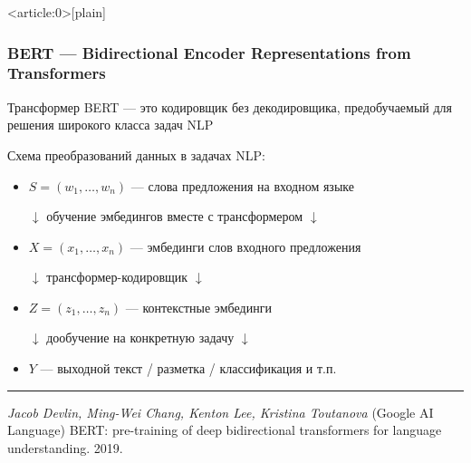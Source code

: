 \documentclass[fullscreen=true, bookmarks=true, hyperref={pdfencoding=unicode}]{beamer}
\begin{document}
{ %
    \begin{frame}<article:0>[plain]
     \end{frame}
}


\begin{frame}
  \frametitle{BERT — Bidirectional Encoder Representations from Transformers}

  Трансформер BERT — это кодировщик без декодировщика, предобучаемый для решения широкого класса задач NLP

  Схема преобразований данных в задачах NLP:

  \begin{itemize}
    \item $S = (w_1, \dots, w_n)$ — слова предложения на входном языке

          $\downarrow$ обучение эмбедингов вместе с трансформером $\downarrow$
    \item $X = (x_1, \dots, x_n)$ — эмбединги слов входного предложения

          $\downarrow$ трансформер-кодировщик $\downarrow$
    \item $Z = (z_1, \dots, z_n)$ — контекстные эмбединги

          $\downarrow$ дообучение на конкретную задачу $\downarrow$
    \item $Y$ — выходной текст / разметка / классификация и т.п.
  \end{itemize}

  \noindent\rule{8cm}{0.4pt}

  {\small
  {\it Jacob Devlin, Ming-Wei Chang, Kenton Lee, Kristina Toutanova} (Google AI Language)
  BERT: pre-training of deep bidirectional transformers for language understanding. 2019.}
\end{frame}
\end{document}
